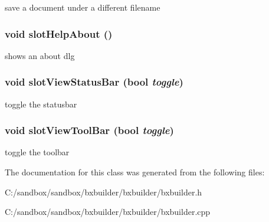save a document under a different filename \hypertarget{class_bxbuilder_app_09e4301881ff984163cce5202603e486}{
\subsubsection[{slotHelpAbout}]{\setlength{\rightskip}{0pt plus 5cm}void slotHelpAbout ()}}
\label{class_bxbuilder_app_09e4301881ff984163cce5202603e486}


shows an about dlg \hypertarget{class_bxbuilder_app_1334d5fff728f7985952f30001c33913}{
\subsubsection[{slotViewStatusBar}]{\setlength{\rightskip}{0pt plus 5cm}void slotViewStatusBar (bool {\em toggle})}}
\label{class_bxbuilder_app_1334d5fff728f7985952f30001c33913}


toggle the statusbar \hypertarget{class_bxbuilder_app_6461fe165888a2c116c9b2bd7c1240d7}{
\subsubsection[{slotViewToolBar}]{\setlength{\rightskip}{0pt plus 5cm}void slotViewToolBar (bool {\em toggle})}}
\label{class_bxbuilder_app_6461fe165888a2c116c9b2bd7c1240d7}


toggle the toolbar 

The documentation for this class was generated from the following files:\begin{CompactItemize}
\item 
C:/sandbox/sandbox/bxbuilder/bxbuilder/bxbuilder.h\item 
C:/sandbox/sandbox/bxbuilder/bxbuilder/bxbuilder.cpp\end{CompactItemize}
